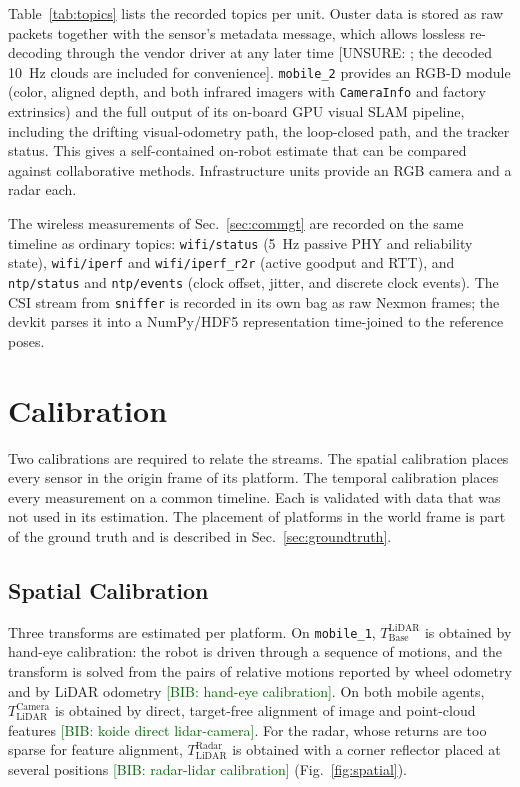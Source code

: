 \documentclass[conference]{IEEEtran}
\newcommand{\unsure}[1]{\textcolor{darkyellow}{[UNSURE: #1]}}
\newcommand{\bib}[1]{\textcolor{darkgreen}{[BIB: #1]}}
\newcommand{\Ttransform}[2]{\ensuremath{T_{\mathrm{#1}}^{\mathrm{#2}}}}
\begin{document}




Table~\ref{tab:topics} lists the recorded topics per unit. Ouster
data is stored as raw packets together with the sensor's metadata
message, which allows lossless re-decoding through the vendor driver
at any later time \unsure{; the decoded \SI{10}{\hertz} clouds are
included for convenience}. \texttt{mobile\_2} provides an RGB-D
module (color, aligned depth, and both infrared imagers with
\texttt{CameraInfo} and factory extrinsics) and the full output of
its on-board GPU visual SLAM pipeline, including the drifting
visual-odometry path, the loop-closed path, and the tracker status.
This gives a self-contained on-robot estimate that can be compared
against collaborative methods. Infrastructure units provide an RGB
camera and a radar each.

The wireless measurements of Sec.~\ref{sec:commgt} are recorded on
the same timeline as ordinary topics: \texttt{wifi/status}
(\SI{5}{\hertz} passive PHY and reliability state),
\texttt{wifi/iperf} and \texttt{wifi/iperf\_r2r} (active goodput and
RTT), and \texttt{ntp/status} and \texttt{ntp/events} (clock offset,
jitter, and discrete clock events). The CSI stream from
\texttt{sniffer} is recorded in its own bag as raw Nexmon frames; the
devkit parses it into a NumPy/HDF5 representation time-joined to the
reference poses.





\section{Calibration}
\label{sec:calibration}
Two calibrations are required to relate the streams. The spatial
calibration places every sensor in the origin frame of its platform.
The temporal calibration places every measurement on a common
timeline. Each is validated with data that was not used in its
estimation. The placement of platforms in the world frame is part of
the ground truth and is described in Sec.~\ref{sec:groundtruth}.

\subsection{Spatial Calibration}
\label{sec:spatial}
Three transforms are estimated per platform. On \texttt{mobile\_1},
\Ttransform{Base}{LiDAR} is obtained by hand-eye calibration: the
robot is driven through a sequence of motions, and the transform is
solved from the pairs of relative motions reported by wheel odometry
and by LiDAR odometry \bib{hand-eye calibration}. On both mobile
agents, \Ttransform{LiDAR}{Camera} is obtained by direct, target-free
alignment of image and point-cloud features \bib{koide direct
lidar-camera}. For the radar, whose returns are too sparse for
feature alignment, \Ttransform{LiDAR}{Radar} is obtained with a
corner reflector placed at several positions \bib{radar-lidar
calibration} (Fig.~\ref{fig:spatial}).
\end{document}
